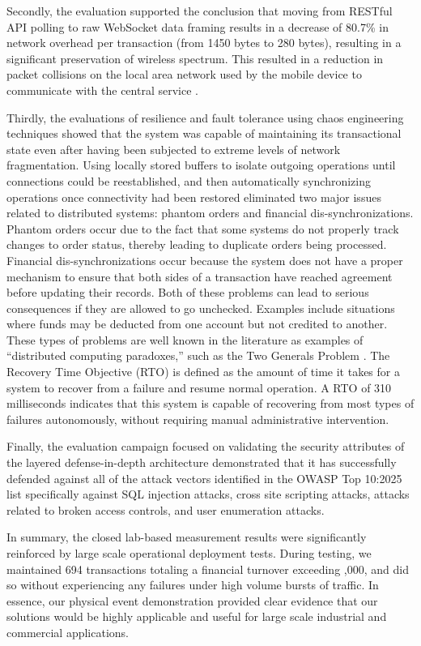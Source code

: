 Secondly, the evaluation supported the conclusion that moving from RESTful API polling to raw WebSocket data framing \cite{fette2011websocket} results in a decrease of 80.7\% in network overhead per transaction (from 1450 bytes to 280 bytes), resulting in a significant preservation of wireless spectrum. This resulted in a reduction in packet collisions on the local area network used by the mobile device to communicate with the central service \cite{ibm2019cloud}.

Thirdly, the evaluations of resilience and fault tolerance using chaos engineering techniques \cite{basiri2016chaos} showed that the system was capable of maintaining its transactional state even after having been subjected to extreme levels of network fragmentation. Using locally stored buffers to isolate outgoing operations until connections could be reestablished, and then automatically synchronizing operations once connectivity had been restored eliminated two major issues related to distributed systems: phantom orders and financial dis-synchronizations. Phantom orders occur due to the fact that some systems do not properly track changes to order status, thereby leading to duplicate orders being processed. Financial dis-synchronizations occur because the system does not have a proper mechanism to ensure that both sides of a transaction have reached agreement before updating their records. Both of these problems can lead to serious consequences if they are allowed to go unchecked. Examples include situations where funds may be deducted from one account but not credited to another. These types of problems are well known in the literature as examples of ``distributed computing paradoxes,'' such as the Two Generals Problem \cite{brewer2012cap}. The Recovery Time Objective (RTO) is defined as the amount of time it takes for a system to recover from a failure and resume normal operation. A RTO of 310 milliseconds indicates that this system is capable of recovering from most types of failures autonomously, without requiring manual administrative intervention.

Finally, the evaluation campaign focused on validating the security attributes of the layered defense-in-depth architecture demonstrated that it has successfully defended against all of the attack vectors identified in the OWASP Top 10:2025 list \cite{owasp2025} specifically against SQL injection attacks, cross site scripting attacks, attacks related to broken access controls, and user enumeration attacks.

In summary, the closed lab-based measurement results were significantly reinforced by large scale operational deployment tests. During testing, we maintained 694 transactions totaling a financial turnover exceeding ,000, and did so without experiencing any failures under high volume bursts of traffic. In essence, our physical event demonstration provided clear evidence that our solutions would be highly applicable and useful for large scale industrial and commercial applications.

